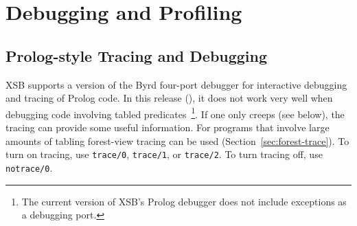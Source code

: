 \chapter{Debugging and Profiling} \label{debugging}
\section{Prolog-style Tracing and Debugging}
%
XSB supports a version of the Byrd four-port debugger for interactive
debugging and tracing of Prolog code.  In this release (\version), it
does not work very well when debugging code involving tabled
predicates~\footnote{The current version of XSB's Prolog debugger does
  not include exceptions as a debugging port.}.  If one only creeps
(see below), the tracing can provide some useful information.  For
programs that involve large amounts of tabling forest-view tracing can
be used (Section~\ref{sec:forest-trace}).
To turn on tracing, use {\tt trace/0}, {\tt trace/1}, or {\tt trace/2}.  To
turn tracing off, use {\tt notrace/0}.

